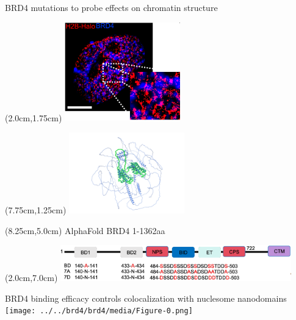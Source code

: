 \documentclass{beamer}					%
\begin{document}
\begin{frame}{BRD4 mutations to probe effects on chromatin structure}

\begin{textblock*}{5cm}(2.0cm,1.75cm)
\includegraphics[width=5cm]{../../dissertation/dissertation/media/TwoColor}
\end{textblock*}

\begin{textblock*}{5cm}(7.75cm,1.25cm)
\includegraphics[width=5cm]{../../brd4/brd4/media/AlphaFoldStructure}
\end{textblock*}

\begin{textblock*}{5cm}(8.25cm,5.0cm)
AlphaFold BRD4 1-1362aa 
\end{textblock*}


\begin{textblock*}{10cm}(2.0cm,7.0cm)
\includegraphics[width=10cm]{../../brd4/brd4/media/Mutations}
\end{textblock*}

\end{frame}


\begin{frame}{BRD4 binding efficacy controls colocalization with nuclesome nanodomains}
\texttt{[image: ../../brd4/brd4/media/Figure-0.png]}
\end{frame}
\end{document}

